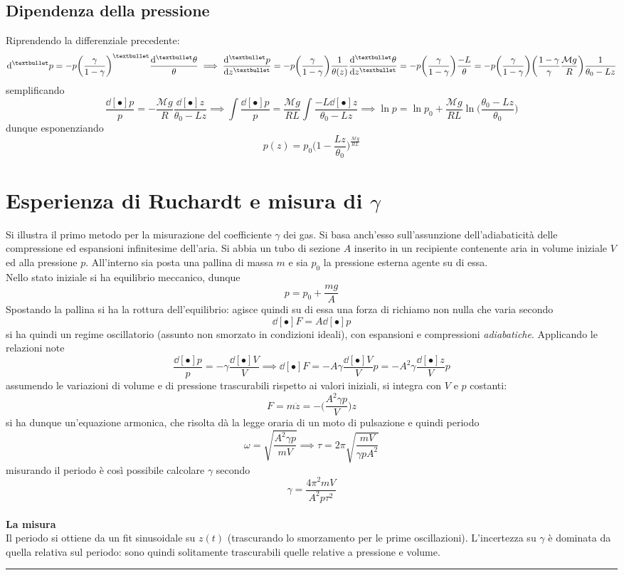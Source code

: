 \documentclass[10pt, oneside]{book}
\newcommand{\molms}{\mathcal{M}}
\newcommand{\infobox}[2]{\vspace{0.5cm}~\\ \textbf{#1} \hrulefill \vspace{0.2cm}\\#2 {}\,\\\hrule \vspace{0.5cm}}
\newcommand{\ds}{\displaystyle}
\begin{document}
\subsection{Dipendenza della pressione}
Riprendendo la differenziale precedente:
\[\dd[•]{p} = - p \bigg(\frac{\gamma}{1-\gamma}\bigg)^{•} \frac{\dd[•]{\theta}}{\theta} \implies \dv[•]{p}{z} = - p \bigg(\frac{\gamma}{1 - \gamma}\bigg) \frac{1}{\theta(z)} \dv[•]{\theta}{z} = - p \bigg(\frac{\gamma}{1 - \gamma}\bigg) \frac{-L}{\theta} = - p \bigg(\frac{\gamma}{1 - \gamma}\bigg) \bigg(\frac{1 - \gamma}{\gamma} \frac{\molms g}{R}\bigg) \frac{1}{\theta_0 - Lz}\]
semplificando
\[\frac{\dd[•]{p}}{p} = - \frac{\molms g}{R} \frac{\dd[•]{z}}{\theta_0 - Lz} \implies \int \frac{\dd[•]{p}}{p} = \frac{\molms g}{RL} \int \frac{-L \dd[•]{z}}{\theta_0 - Lz} \implies \ln p = \ln p_0 + \frac{\molms g}{RL} \ln \bigg( \frac{\theta_0 - Lz}{\theta_0}\bigg)\]
dunque esponenziando 
\[p(z) = p_0 \bigg(1 - \frac{Lz}{\theta_0}\bigg)^{\ds \frac{\molms g}{RL}}\]

\section{Esperienza di Ruchardt e misura di $\gamma$}
Si illustra il primo metodo per la misurazione del coefficiente $\gamma$ dei gas. Si basa anch'esso sull'assunzione dell'adiabaticità delle compressione ed espansioni infinitesime dell'aria. Si abbia un tubo di sezione $A$ inserito in un recipiente contenente aria in volume iniziale $V$ ed alla pressione $p$. All'interno sia posta una pallina di massa $m$ e sia $p_0$ la pressione esterna agente su di essa.\\
Nello stato iniziale si ha equilibrio meccanico, dunque
\[p = p_0 + \frac{mg}{A}\] 
Spostando la pallina si ha la rottura dell'equilibrio: agisce quindi su di essa una forza di richiamo non nulla che varia secondo
\[\dd[•]{F} = A \dd[•]{p}\]
si ha quindi un regime oscillatorio (assunto non smorzato in condizioni ideali), con espansioni e compressioni \textit{adiabatiche}. Applicando le relazioni note
\[\frac{\dd[•]{p}}{p} = - \gamma \frac{\dd[•]{V}}{V} \implies \dd[•]{F} = - A \gamma \frac{\dd[•]{V}}{V}p =  - A^2 \gamma \frac{\dd[•]{z}}{V}p\]
assumendo le variazioni di volume e di pressione trascurabili rispetto ai valori iniziali, si integra con $V$ e $p$ costanti:
\[F = m \ddot z = - \bigg(\frac{A^2 \gamma p}{V}\bigg)z\]
si ha dunque un'equazione armonica, che risolta dà la legge oraria di un moto di pulsazione e quindi periodo
\[\omega = \sqrt{\frac{A^2 \gamma p}{m V}} \implies \tau = 2 \pi \sqrt{\frac{mV}{\gamma p A^2}}\]
misurando il periodo è così possibile calcolare $\gamma$ secondo
\[\gamma = \frac{4 \pi^2 m V}{A^2 p \tau^2}\]
\infobox{La misura}{Il periodo si ottiene da un fit sinusoidale su $z(t)$ (trascurando lo smorzamento per le prime oscillazioni). L'incertezza su $\gamma$ è dominata da quella relativa sul periodo: sono quindi solitamente trascurabili quelle relative a pressione e volume.}
\end{document}
